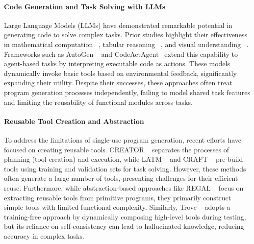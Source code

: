 \paragraph{Code Generation and Task Solving with LLMs} Large Language Models (LLMs) have demonstrated remarkable potential in generating code to solve complex tasks. Prior studies highlight their effectiveness in mathematical computation ~\citep{zhou2023solving, wang2023mathcoder, gou2023tora}, tabular reasoning ~\citep{chen2022program, lyu2023faithful, lu2024chameleon}, and visual understanding ~\citep{suris2023vipergpt, choudhury2023zero, gupta2023visual}. Frameworks such as AutoGen ~\citep{wu2023autogen} and CodeActAgent~\citep{wang2024executable} extend this capability to agent-based tasks by interpreting executable code as actions. These models dynamically invoke basic tools based on environmental feedback, significantly expanding their utility. Despite their successes, these approaches often treat program generation processes independently, failing to model shared task features and limiting the reusability of functional modules across tasks.

\paragraph{Reusable Tool Creation and Abstraction} To address the limitations of single-use program generation, recent efforts have focused on creating reusable tools. CREATOR ~\citep{qian2023creator} separates the processes of planning (tool creation) and execution, while LATM ~\citep{cai2023large} and CRAFT ~\citep{yuan2023craft} pre-build tools using training and validation sets for task solving. However, these methods often generate a large number of tools, presenting challenges for their efficient reuse. Furthermore, while abstraction-based approaches like REGAL ~\citep{stengel2024regal} focus on extracting reusable tools from primitive programs, they primarily construct simple tools with limited functional complexity. Similarly, Trove ~\citep{wang2024trove} adopts a training-free approach by dynamically composing high-level tools during testing, but its reliance on self-consistency can lead to hallucinated knowledge, reducing accuracy in complex tasks.

